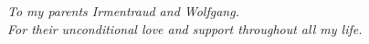 \documentclass[oneside]{book}
\newcommand\blankpage{%
    \null
    \thispagestyle{empty}%
    \addtocounter{page}{-1}%
    \newpage}
\begin{document}
\cleardoublepage
\afterpage{\blankpage}

\clearpage
\thispagestyle{plain}

\clearpage
\begin{center}
    \thispagestyle{empty}
    \vspace*{\fill}
    \textit{To my parents Irmentraud and Wolfgang. \\ For their unconditional love and support throughout all my life.}
    \vspace*{\fill}
\end{center}

\newpage


\newpage

\newpage


\tableofcontents
\listoffigures
\listoftables


\end{document}
